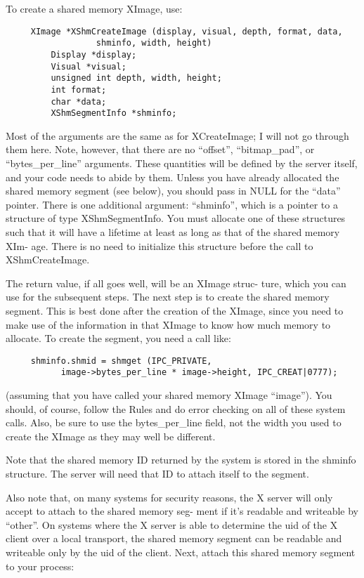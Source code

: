 \documentclass{article}
\begin{document}
To create a shared memory XImage, use:

\begin{verbatim}
     XImage *XShmCreateImage (display, visual, depth, format, data,
			      shminfo, width, height)
	     Display *display;
	     Visual *visual;
	     unsigned int depth, width, height;
	     int format;
	     char *data;
	     XShmSegmentInfo *shminfo;
\end{verbatim}

Most of the arguments are the same as for XCreateImage; I
will not go through them here.	Note, however, that there
are no ``offset'', ``bitmap\_pad'', or ``bytes\_per\_line''
arguments.  These quantities will be defined by the server
itself, and your code needs to abide by them.  Unless you
have already allocated the shared memory segment (see
below), you should pass in NULL for the ``data'' pointer.
There is one additional argument: ``shminfo'', which is a
pointer to a structure of type XShmSegmentInfo.	 You must
allocate one of these structures such that it will have a
lifetime at least as long as that of the shared memory XIm-
age.  There is no need to initialize this structure before
the call to XShmCreateImage.

The return value, if all goes well, will be an XImage struc-
ture, which you can use for the subsequent steps.
The next step is to create the shared memory segment.  This
is best done after the creation of the XImage, since you
need to make use of the information in that XImage to know
how much memory to allocate.  To create the segment, you
need a call like:

\begin{verbatim}
     shminfo.shmid = shmget (IPC_PRIVATE,
	       image->bytes_per_line * image->height, IPC_CREAT|0777);
\end{verbatim}

(assuming that you have called your shared memory XImage
``image'').  You should, of course, follow the Rules and do
error checking on all of these system calls.  Also, be sure
to use the bytes\_per\_line field, not the width you used to
create the XImage as they may well be different.

Note that the shared memory ID returned by the system is
stored in the shminfo structure.  The server will need that
ID to attach itself to the segment.

Also note that, on many systems for security reasons, the X
server will only accept to attach to the shared memory seg-
ment if it's readable and writeable by ``other''. On systems
where the X server is able to determine the uid of the X
client over a local transport, the shared memory segment can
be readable and writeable only by the uid of the client.
Next, attach this shared memory segment to your process:
\end{document}
